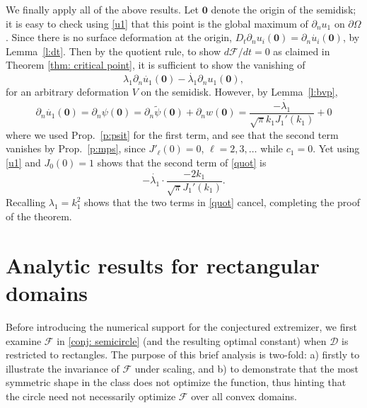 \documentclass{amsart}
\newcommand{\be}{\begin{equation}}
\newcommand{\ee}{\end{equation}}
\newcommand{\mbf}[1]{{\mathbf #1}}
\newcommand{\pO}{{\partial\Omega}}
\newcommand{\dn}{{\partial_n}}
\theoremstyle{plain}
\begin{document}
We finally apply all of the above results.
Let $\mbf{0}$ denote the origin of the semidisk; it is easy to check using
\eqref{u1} that this point is the global maximum of $\dn u_1$ on $\pO$.
Since there is no surface deformation at the origin,
$D_t \dn u_i(\mbf{0}) = \dn \dot{u_i}(\mbf{0})$, by Lemma~\ref{l:dt}.
Then by the quotient rule, to show $d{\mathcal F}/dt =0$ as claimed
in Theorem \ref{thm: critical point},
it is sufficient to show the vanishing of
\be
\lambda_1 \dn \dot{u_1}(\mbf{0}) - \dot{\lambda_1} \dn u_1(\mbf{0}),
\label{quot}
\ee
for an arbitrary deformation $V$ on the semidisk.
However, by Lemma~\ref{l:bvp},
\[
\dn \dot{u_1}(\mbf{0}) = \dn \psi(\mbf{0})
= \dn \tilde\psi(\mbf{0}) + \dn w(\mbf{0})
 = \frac{-\dot{\lambda_1}}{\sqrt{\pi}k_1 J_1'(k_1)} + 0
\]
where we used Prop.~\ref{p:psit} for the first term, and see that the second
term vanishes by Prop.~\ref{p:mps}, since $J'_\ell(0)=0$, $\ell=2,3,\dots$
while $c_1=0$.
Yet using \eqref{u1} and $J_0(0)=1$ shows that the second term of \eqref{quot}
is
\[
- \dot{\lambda_1} \cdot \frac{-2k_1}{\sqrt{\pi}J_1'(k_1)}.
\]
Recalling $\lambda_1=k_1^2$ shows that the two terms in \eqref{quot} cancel,
completing the proof of the theorem.

\section{Analytic results for rectangular domains}\label{sec:extremizer}
Before introducing the numerical support for the conjectured extremizer, we first examine $\mathcal{F}$ in \eqref{conj: semicircle} (and the resulting optimal constant) when $\mathcal{D}$ is restricted to rectangles. The purpose of this brief analysis is two-fold: a) firstly to illustrate the invariance of $\mathcal{F}$ under scaling, and b) to demonstrate that the most symmetric shape in the class does not optimize the function, thus hinting that the circle need not necessarily optimize $\mathcal{F}$ over all convex domains.
\end{document}

